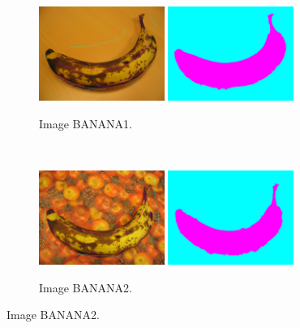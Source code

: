\begin{figure}[htb]
	\centering	
	 \begin{subfigure}[B]{0.7\textwidth}	
			\includegraphics[width=0.45\textwidth]{images/evaluation/Milles/banana1_seeds.jpg}
			\includegraphics[width=0.45\textwidth]{images/evaluation/Milles/banana1_seg.png}
		 \caption{Image BANANA1.}
	\end{subfigure}		
	\\	
	 \begin{subfigure}[B]{0.7\textwidth}	
			\includegraphics[width=0.45\textwidth]{images/evaluation/Milles/banana2_seeds.jpg}
			\includegraphics[width=0.45\textwidth]{images/evaluation/Milles/banana2_seg.png}
		 \caption{Image BANANA2.}
	\end{subfigure}		

\end{figure}
